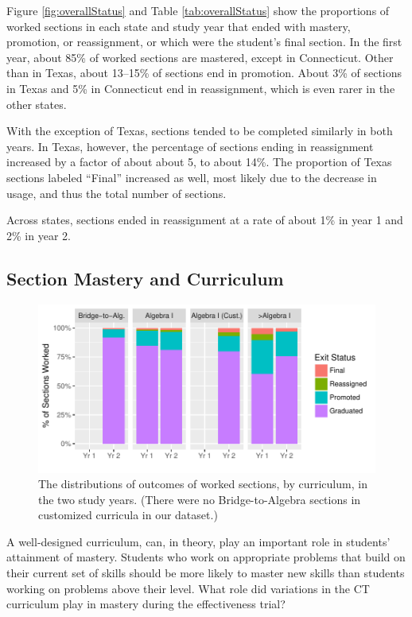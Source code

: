 \documentclass[12pt]{article}\usepackage[]{graphicx}\usepackage[]{color}
\makeatletter
\def\maxwidth{ %
  \ifdim\Gin@nat@width>\linewidth
    \linewidth
  \else
    \Gin@nat@width
  \fi
}
\makeatother
\begin{document}
Figure \ref{fig:overallStatus} and Table \ref{tab:overallStatus} show
the proportions of worked sections in each state and study year that
ended with mastery, promotion, or reassignment, or which were the
student's final section.
In the first year, about
85\% of
worked sections are mastered, except in Connecticut.
Other than in Texas, about
13--15\%
of sections end in promotion.
About 3\% of sections in Texas
and 5\%
in Connecticut end in reassignment, which is even rarer in the other states.

With the exception of Texas, sections tended to be completed similarly
in both years.
In Texas, however, the percentage of sections ending in reassignment increased by a factor
of about about
5,
to about 14\%.
The proportion of Texas sections labeled ``Final'' increased as well,
most likely due to the decrease in usage, and thus the total number of
sections.

Across states, sections ended in reassignment at a rate of about
1\% in year 1 and
2\% in year 2.

\subsection{Section Mastery and Curriculum}
\begin{figure}
  \centering

\includegraphics[width=\maxwidth]{figure/statusCur-1} 

\caption{The distributions of outcomes of worked sections, by
  curriculum, in the two study years. (There were no Bridge-to-Algebra
sections in customized curricula in our dataset.)}
\label{fig:statusCur}
\end{figure}

A well-designed curriculum, can, in theory, play an important role in
students' attainment of mastery.
Students who work on appropriate problems that build on their current
set of skills should be more likely to master new skills than students
working on problems above their level.
What role did variations in the CT curriculum play in mastery during the effectiveness trial?
\end{document}
